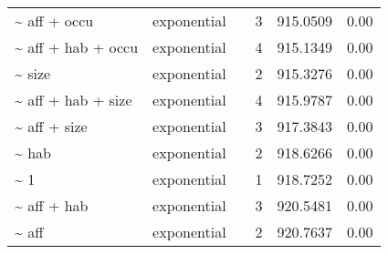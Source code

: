 \begin{table}[ht]
\begin{tabular}{llrrrr}
  \~{} aff + occu & exponential &  & 3 & 915.0509 & 0.00 \\ 
  \~{} aff + hab + occu & exponential &  & 4 & 915.1349 & 0.00 \\ 
  \~{} size & exponential &  & 2 & 915.3276 & 0.00 \\ 
  \~{} aff + hab + size & exponential &  & 4 & 915.9787 & 0.00 \\ 
  \~{} aff + size & exponential &  & 3 & 917.3843 & 0.00 \\ 
  \~{} hab & exponential &  & 2 & 918.6266 & 0.00 \\ 
  \~{} 1 & exponential &  & 1 & 918.7252 & 0.00 \\ 
  \~{} aff + hab & exponential &  & 3 & 920.5481 & 0.00 \\ 
  \~{} aff & exponential &  & 2 & 920.7637 & 0.00 \\ 
  \end{tabular}
\label{tab:mod}
\end{table}
